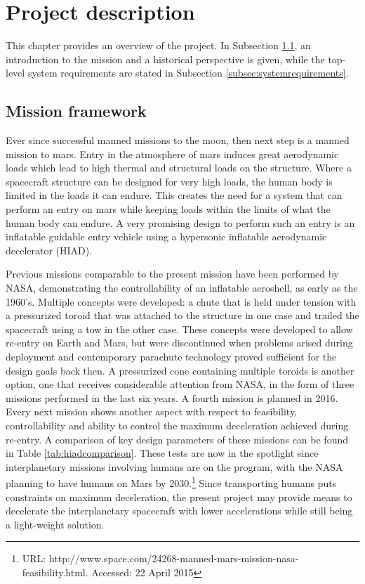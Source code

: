 \section{Project description}\label{cha:project_description}%
This chapter provides an overview of the project. In Subsection \ref{subsec:missionframework}, an introduction to the mission and a historical perspective is given, while the top-level system requirements are stated in Subsection \ref{subsec:systemrequirements}.

\subsection{Mission framework} 
\label{subsec:missionframework}
Ever since successful manned missions to the moon, then next step is a manned mission to mars. Entry in the atmosphere of mars induces great aerodynamic loads which lead to high thermal and structural loads on the structure. Where a spacecraft structure can be designed for very high loads, the human body is limited in the loads it can endure. This creates the need for a system that can perform an entry on mars while keeping loads within the limits of what the human body can endure. A very promising design to perform such an entry is an inflatable guidable entry vehicle using a hypersonic inflatable aerodynamic decelerator (HIAD).

Previous missions comparable to the present mission have been performed by NASA, demonstrating the controllability of an inflatable aeroshell, as early as the 1960's. Multiple concepts were developed: a chute that is held under tension with a pressurized toroid that was attached to the structure in one case and trailed the spacecraft using a tow in the other case. These concepts were developed to allow re-entry on Earth and Mars, but were discontinued when problems arised during deployment and contemporary parachute technology proved sufficient for the design goals back then. \citep{hiadhistory}
A pressurized cone containing multiple toroids is another option, one that receives considerable attention from NASA, in the form of three missions performed in the last six years. A fourth mission is planned in 2016. \cite{irve2,irve3,thor} Every next mission shows another aspect with respect to feasibility, controllability and ability to control the maximum deceleration achieved during re-entry. A comparison of key design parameters of these missions can be found in Table \ref{tab:hiadcomparison}.
These tests are now in the spotlight since interplanetary missions involving humans are on the program, with the NASA planning to have humans on Mars by 2030.\footnote{URL: http://www.space.com/24268-manned-mars-mission-nasa-feasibility.html. Accessed: 22 April 2015} Since transporting humans puts constraints on maximum deceleration, the present project may provide means to decelerate the interplanetary spacecraft with lower accelerations while still being a light-weight solution.

